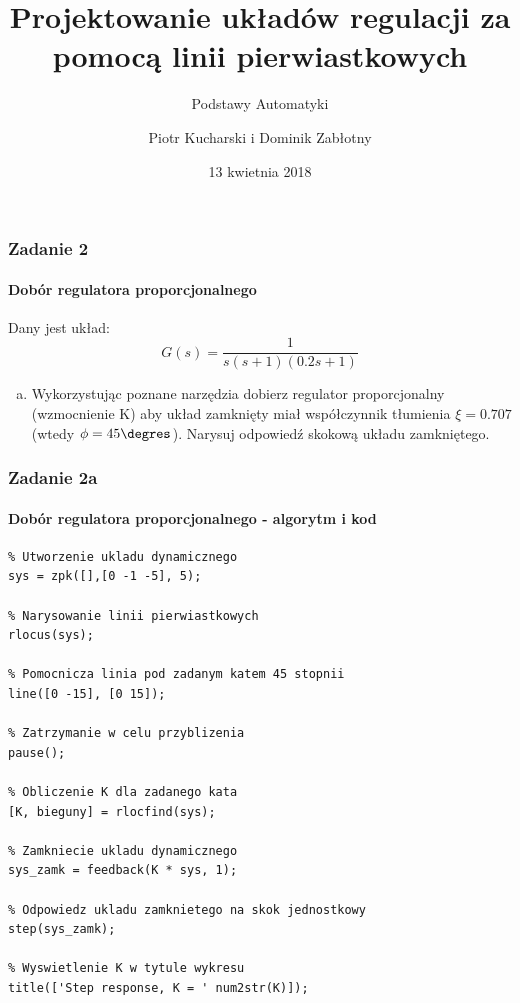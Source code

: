 \documentclass{beamer}
\title{Projektowanie układów regulacji za pomocą linii pierwiastkowych}
\subtitle{Podstawy Automatyki}
\author{Piotr Kucharski i Dominik Zabłotny}
\institute{Wydział Elekrotechniki, Automatyki, Informatyki i Inżynierii Biomedycznej}
\date{13 kwietnia 2018}
\begin{document}
\titleframe[pl]

\begin{frame}\frametitle{Zadanie 2}\framesubtitle{Dobór regulatora proporcjonalnego}
	Dany jest układ:
	\[
	G(s) = \frac{1}{s(s+1)(0.2s+1)}
	\]
    \begin{enumerate}[a)]
        \item Wykorzystując poznane narzędzia dobierz regulator proporcjonalny (wzmocnienie K) aby układ zamknięty miał współczynnik tłumienia $\xi = 0.707$ (wtedy $\phi = 45\degres$). Narysuj odpowiedź skokową układu zamkniętego.
        
        
    \end{enumerate}
\end{frame}

\begin{frame}[fragile]\frametitle{Zadanie 2a}\framesubtitle{Dobór regulatora proporcjonalnego - algorytm i kod}
	\begin{lstlisting}
% Utworzenie ukladu dynamicznego
sys = zpk([],[0 -1 -5], 5);

% Narysowanie linii pierwiastkowych
rlocus(sys);

% Pomocnicza linia pod zadanym katem 45 stopnii
line([0 -15], [0 15]);           

% Zatrzymanie w celu przyblizenia
pause();                            

% Obliczenie K dla zadanego kata
[K, bieguny] = rlocfind(sys);       

% Zamkniecie ukladu dynamicznego
sys_zamk = feedback(K * sys, 1);    

% Odpowiedz ukladu zamknietego na skok jednostkowy
step(sys_zamk);                     

% Wyswietlenie K w tytule wykresu
title(['Step response, K = ' num2str(K)]);
	\end{lstlisting}
\end{frame}
\end{document}
